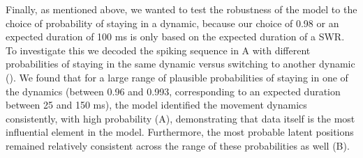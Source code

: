 \documentclass[9pt,lineno]{elife}
\begin{document}
Finally, as mentioned above, we wanted to test the robustness of the model to the choice of probability of staying in a dynamic, because our choice of 0.98 or an expected duration of 100 ms is only based on the expected duration of a SWR. To investigate this we decoded the spiking sequence in A with different probabilities of staying in the same dynamic versus switching to another dynamic (). We found that for a large range of plausible probabilities of staying in one of the dynamics (between 0.96 and 0.993, corresponding to an expected duration between 25 and 150 ms), the model identified the movement dynamics consistently, with high probability (A), demonstrating that data itself is the most influential element in the model. Furthermore, the most probable latent positions remained relatively consistent across the range of these probabilities as well (B).
\end{document}
